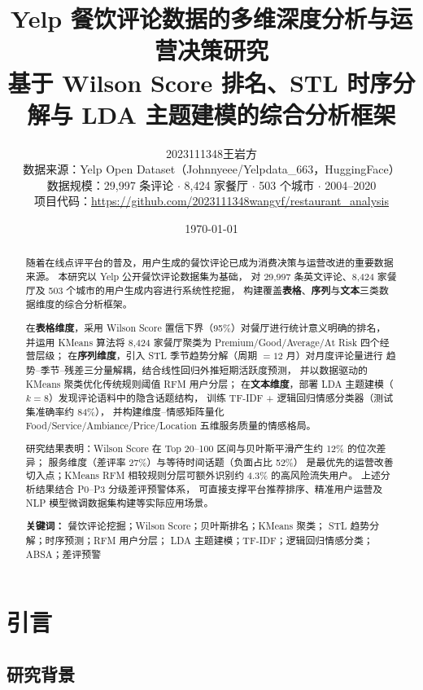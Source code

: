 \documentclass[12pt, a4paper]{article}
\title{
  \vspace{-1cm}
  {\huge\bfseries\color{NavyBlue}
    Yelp 餐饮评论数据的多维深度分析与运营决策研究}\\[0.5em]
  {\large
    基于 Wilson Score 排名、STL 时序分解与 LDA 主题建模的综合分析框架}
}
\author{
  \large 2023111348\quad 王岩方\\[0.3em]
  \small 数据来源：Yelp Open Dataset（Johnnyeee/Yelpdata\_663，HuggingFace）\\
  \small 数据规模：29,997 条评论 $\cdot$ 8,424 家餐厅 $\cdot$ 503 个城市 $\cdot$ 2004--2020\\[0.4em]
  \small 项目代码：\url{https://github.com/2023111348wangyf/restaurant_analysis}
}
\date{\today}
\begin{document}

\maketitle
\thispagestyle{empty}

\begin{abstract}
\noindent
随着在线点评平台的普及，用户生成的餐饮评论已成为消费决策与运营改进的重要数据来源。
本研究以 Yelp 公开餐饮评论数据集为基础，
对 29,997 条英文评论、8,424 家餐厅及 503 个城市的用户生成内容进行系统性挖掘，
构建覆盖\textbf{表格}、\textbf{序列}与\textbf{文本}三类数据维度的综合分析框架。

在\textbf{表格维度}，采用 Wilson Score 置信下界（95\%）对餐厅进行统计意义明确的排名，
并运用 KMeans 算法将 8,424 家餐厅聚类为 Premium/Good/Average/At Risk 四个经营层级；
在\textbf{序列维度}，引入 STL 季节趋势分解（周期 $= 12$ 月）对月度评论量进行
趋势--季节--残差三分量解耦，结合线性回归外推短期活跃度预测，
并以数据驱动的 KMeans 聚类优化传统规则阈值 RFM 用户分层；
在\textbf{文本维度}，部署 LDA 主题建模（$k=8$）发现评论语料中的隐含话题结构，
训练 TF-IDF + 逻辑回归情感分类器（测试集准确率约 84\%），
并构建维度--情感矩阵量化 Food/Service/Ambiance/Price/Location
五维服务质量的情感格局。

研究结果表明：Wilson Score 在 Top 20--100 区间与贝叶斯平滑产生约 12\% 的位次差异；
服务维度（差评率 27\%）与等待时间话题（负面占比 52\%）
是最优先的运营改善切入点；KMeans RFM 相较规则分层可额外识别约 4.3\% 的高风险流失用户。
上述分析结果结合 P0--P3 分级差评预警体系，
可直接支撑平台推荐排序、精准用户运营及 NLP 模型微调数据集构建等实际应用场景。

\medskip
\noindent\textbf{关键词：}
餐饮评论挖掘；Wilson Score；贝叶斯排名；KMeans 聚类；
STL 趋势分解；时序预测；RFM 用户分层；
LDA 主题建模；TF-IDF；逻辑回归情感分类；ABSA；差评预警
\end{abstract}

\tableofcontents
\newpage

\section{引言}

\subsection{研究背景}
\end{document}
